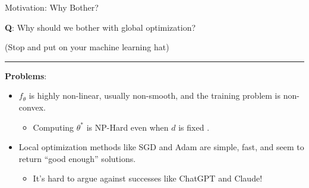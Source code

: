 \documentclass[usenames,dvipsnames,notheorems]{beamer}
\newcommand{\horizontalrule}{
	{
			\vspace{-0.5em}
			\center \rule{\textwidth}{0.1em}
			\vspace{-0.2em}
		}
}
\newcommand{\bad}[1]{\textcolor{bad}{#1}}
\newcommand{\good}[1]{\textcolor{good}{#1}}
\begin{document}
\begin{frame}{Motivation: Why Bother?}

	\begin{center}
		\large
		\textbf{Q}: Why should we bother with global optimization?

		\pause
		\vspace{2ex}
		{\normalsize \good{(Stop and put on your machine learning hat)}}
	\end{center}

	\pause
	\horizontalrule

	\textbf{Problems}:

	\pause
	\vspace{0.5ex}

	\begin{itemize}
		\item \( f_\theta \) is highly \bad{non-linear}, usually
		      \bad{non-smooth}, and the training problem is \bad{non-convex}.

		      \pause
		      \vspace{1ex}
		      \begin{itemize}
			      \item[$\quad \longrightarrow$ ] Computing \( \theta^* \) is \bad{NP-Hard}
			            even when \( d \) is fixed \citep{froese2023hard}.
		      \end{itemize}

		      \pause
		      \vspace{1ex}

		\item Local optimization methods like SGD and Adam are \good{simple},
		      \good{fast}, and seem to return ``\good{good enough}''
		      solutions.
		      \pause
		      \vspace{1ex}

		      \begin{itemize}
			      \item[$\quad \longrightarrow$ ] It's hard to argue against
			            successes like \good{ChatGPT} and \good{Claude}!
		      \end{itemize}
	\end{itemize}

\end{frame}
\end{document}
